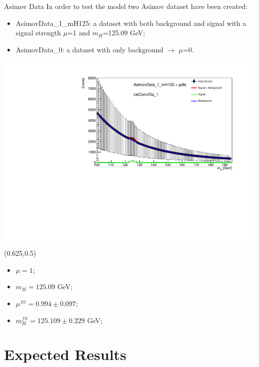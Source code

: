 \documentclass[10pt,UKenglish, leqno, xcolor = dvipsnames]{beamer}
\begin{document}
	\begin{frame}{Asimov Data}
		\vfill
		In order to test the model two Asimov dataset have been created:
		\begin{itemize}
			\item AsimovData\_1\_mH125: a dataset with both background and signal with a signal strength $\mu$=1  and $m_H$=125.09 GeV;
			\item AsimovData\_0: a dataset with only background $\to$ $\mu$=0.
		\end{itemize}
		\includegraphics[width=.7\textwidth]{Pres_Images/check_Asimov_catConvEta_1.pdf}
		
		\begin{textblock}{}(0.625,0.5)
			\small
			\begin{itemize}
				\item $\mu = 1$;
				\item $m_H = 125.09$ GeV;
				\item $\mu^{fit} = 0.994 \pm 0.097$;
				\item $m^{fit}_H = 125.109 \pm 0.229$ GeV;
			\end{itemize}
		\end{textblock}
		
		
	\end{frame}

	\section{Expected Results}
	\SectionPage
	
\end{document}
